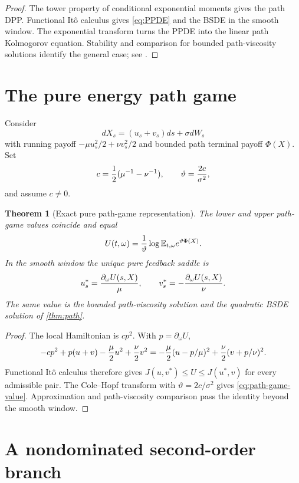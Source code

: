 \documentclass[11pt,reqno]{amsart}
\newtheorem{theorem}{Theorem}[section]
\theoremstyle{definition}
\theoremstyle{remark}
\newcommand{\E}{\mathbb E}
\begin{document}
\begin{proof}
The tower property of conditional exponential moments gives the path DPP.
Functional It\^o calculus gives \eqref{eq:PPDE} and the BSDE in the smooth
window.  The exponential transform turns the PPDE into the linear path
Kolmogorov equation.  Stability and comparison for bounded path-viscosity
solutions identify the general case; see
\cite{ContFournie2013,EkrenTouziZhang2014I,EkrenTouziZhang2014II}.
\end{proof}

\section{The pure energy path game}

Consider
\[
 dX_s=(u_s+v_s)ds+\sigma dW_s
\]
with running payoff
$-\mu u_s^2/2+\nu v_s^2/2$ and bounded path terminal payoff $\Phi(X)$.
Set
\[
 c={1\over2}(\mu^{-1}-\nu^{-1}),
 \qquad \vartheta={2c\over\sigma^2},
\]
and assume $c\ne0$.

\begin{theorem}[Exact pure path-game representation]\label{thm:path-game}
The lower and upper path-game values coincide and equal
\begin{equation}\label{eq:path-game-value}
 U(t,\omega)={1\over\vartheta}
 \log\E_{t,\omega}e^{\vartheta\Phi(X)}.
\end{equation}
In the smooth window the unique pure feedback saddle is
\[
 u_s^*={\partial_\omega U(s,X)\over\mu},
 \qquad
 v_s^*=-{\partial_\omega U(s,X)\over\nu}.
\]
The same value is the bounded path-viscosity solution and the quadratic BSDE
solution of \cref{thm:path}.
\end{theorem}

\begin{proof}
The local Hamiltonian is $c p^2$.  With $p=\partial_\omega U$,
\[
 -cp^2+p(u+v)-{\mu\over2}u^2+{\nu\over2}v^2
 =-{\mu\over2}(u-p/\mu)^2
 +{\nu\over2}(v+p/\nu)^2.
\]
Functional It\^o calculus therefore gives
$J(u,v^*)\le U\le J(u^*,v)$ for every admissible pair.  The Cole--Hopf
transform with $\vartheta=2c/\sigma^2$ gives
\eqref{eq:path-game-value}.  Approximation and path-viscosity comparison pass
the identity beyond the smooth window.
\end{proof}

\section{A nondominated second-order branch}
\end{document}
